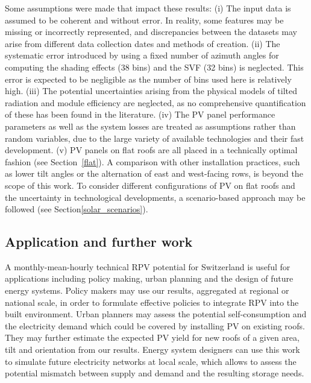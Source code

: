 Some assumptions were made that impact these results:
(i) The input data is assumed to be coherent and without error. In reality, some features may be missing or incorrectly represented, and discrepancies between the datasets may arise from  different data collection dates and methods of creation.
(ii) The systematic error introduced by using a fixed number of azimuth angles for computing the shading effects (38 bins) and the SVF (32 bins) is neglected. This error is expected to be negligible as the number of bins used here is relatively high.
(iii) The potential uncertainties arising from the physical models of tilted radiation and module efficiency are neglected, as no comprehensive quantification of these has been found in the literature.
(iv) The PV panel performance parameters as well as the system losses are treated as assumptions rather than random variables, due to the large variety of available technologies and their fast development. 
(v) PV panels on flat roofs are all placed in a technically optimal fashion (see Section~\ref{flat}). 
A comparison with other installation practices, such as lower tilt angles or the alternation of east and west-facing rows, is beyond the scope of this work.
To consider different configurations of PV on flat roofs and the uncertainty in technological developments, a scenario-based approach may be followed (see Section\ref{solar_scenarios}).


\subsection{Application and further work}
\label{application_pv}
A monthly-mean-hourly technical RPV potential for Switzerland is useful for applications including policy making, urban planning and the design of future energy systems. 
Policy makers may use our results, aggregated at regional or national scale, in order to formulate effective policies to integrate RPV into the built environment. 
Urban planners may assess the potential self-consumption and the electricity demand which could be covered by installing PV on existing roofs. They may further estimate the expected PV yield for new roofs of a given area, tilt and orientation from our results. 
Energy system designers can use this work to simulate future electricity networks at local scale, which allows to assess the potential mismatch between supply and demand and the resulting storage needs. 

